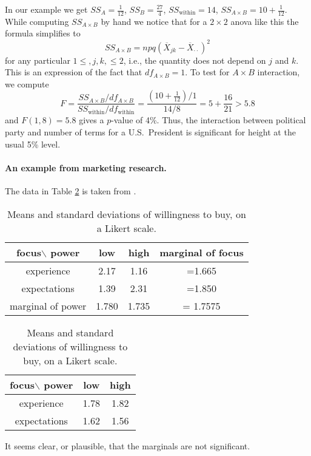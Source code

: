 In our example we get $SS_A=\frac1{12}$, $SS_B=\frac{27}4$, $SS_{\text{within}}=14$, $SS_{A\times B}=10+\frac1{12}$. While computing $SS_{A\times B}$ by hand we notice that for a $2\times 2$ anova like this the formula simplifies to
\[
	SS_{A\times B} = npq (\overline X_{jk}-\overline X_{\cdot\cdot})^2
\]
for any particular $1\le ,j, k,\le 2$, i.e., the quantity does not depend on $j$ and $k$. This is an expression of the fact that $df_{A\times B}=1$.
To test for $A\times B$ interaction, we compute
\[
	F = \frac{SS_{A\times B}/df_{A\times B}}{SS_{\text{within}}/df_{\text{within}}} = \frac{(10+\frac1{12})/1}{14/8} = 5+\frac{16}{21} > 5.8
\]
and $F(1,8)=5.8$ gives a $p$-value of 4\%. Thus, the interaction between political party and number of terms for a U.S.~President is significant for height at the usual 5\% level.

\paragraph{An example from marketing research.}
The data in Table \ref{RuckerHuGalinsky} is taken from .
\begin{table}
\centering
\begin{tabular}{|c|c|c|c|}
\hline
focus$\backslash$ power	&	low	& high & marginal of focus\\
\hline
experience			& 	2.17 & 1.16 & =1.665\\
expectations			&	1.39 & 2.31 & =1.850\\
\hline
marginal of power		&	1.780 & 1.735 & = 1.7575\\
\hline
\end{tabular}
\begin{tabular}{|c|c|c|}
\hline
focus$\backslash$ power	&	low	& high \\
\hline
experience			& 	1.78 & 1.82 \\
expectations			&	1.62 & 1.56 \\
\hline
\end{tabular}
\caption{Means and standard deviations of willingness to buy, on a Likert scale.}\label{RuckerHuGalinsky}
\end{table}

It seems clear, or plausible, that the marginals are not significant.

